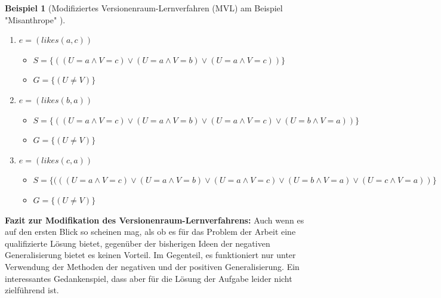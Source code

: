 \documentclass[a4paper, 11pt]{book}
\newtheorem{Bsp}{Beispiel}[section]
\begin{document}
{\begin{Bsp}[Modifiziertes Versionenraum-Lernverfahren (MVL) am Beispiel "{}Misanthrope"{} ]
\begin{itemize}
\begin{enumerate}
		\begin{itemize}
			\item $ S = \{(U = a \land V = c) \lor (U = a \land V = b)\}$ 
			\item $ G = \{(U \neq V)\} $
		\end{itemize}
		\item $ e = (likes(a,c)) $
		\begin{itemize}
			\item $ S = \{((U = a \land V = c) \lor (U = a \land V = b) \lor (U = a \land V = c))\}$ 
			\item $ G = \{(U \neq V)\} $
		\end{itemize}	
		\item $ e = (likes(b,a)) $
		\begin{itemize}
			\item $ S = \{((U = a \land V = c) \lor (U = a \land V = b) \lor (U = a \land V = c) \lor (U = b \land V = a))\}$ 
			\item $ G = \{(U \neq V)\} $
		\end{itemize}
		\item $ e = (likes(c,a)) $
		\begin{itemize}
			\item $ S = \{(((U = a \land V = c) \lor (U = a \land V = b) \lor (U = a \land V = c) \lor (U = b \land V = a) \lor (U = c \land V = a))\}$ 
			\item $ G = \{(U \neq V)\} $
		\end{itemize}	
	\end{enumerate}
\end{itemize}
\end{Bsp}
\textbf{{\Large Fazit zur Modifikation des Versionenraum-Lernverfahrens:}} \label{Fazit VRL} 
Auch wenn es auf den ersten Blick so scheinen mag, als ob es für das Problem der Arbeit eine qualifizierte Lösung bietet, gegenüber der bisherigen Ideen der negativen Generalisierung bietet es keinen Vorteil. Im Gegenteil, es funktioniert nur unter Verwendung der Methoden der negativen und der positiven Generalisierung. Ein interessantes Gedankenspiel, dass aber für die Lösung der Aufgabe leider nicht zielführend ist. 
}
\end{document}
